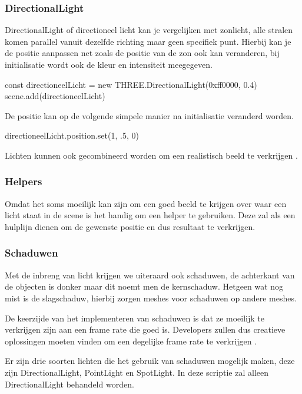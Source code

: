 \subsubsection{DirectionalLight}

DirectionalLight of directioneel licht kan je vergelijken met zonlicht, alle stralen komen parallel vanuit dezelfde richting maar geen specifiek punt. Hierbij kan je de positie aanpassen net zoals de positie van de zon ook kan veranderen, bij initialisatie wordt ook de kleur en intensiteit meegegeven.

\begin{LVerbatim}
const directioneelLicht = new THREE.DirectionalLight(0xff0000, 0.4)
scene.add(directioneelLicht)
\end{LVerbatim}

De positie kan op de volgende simpele manier na initialisatie veranderd worden.

\begin{LVerbatim}
directioneelLicht.position.set(1, .5, 0)
\end{LVerbatim}

Lichten kunnen ook gecombineerd worden om een realistisch beeld te verkrijgen  \autocite{Simon2023}.

\subsubsection{Helpers}

Omdat het soms moeilijk kan zijn om een goed beeld te krijgen over waar een licht staat in de scene is het handig om een helper te gebruiken. Deze zal als een hulplijn dienen om de gewenste positie en dus resultaat te verkrijgen.

\subsubsection{Schaduwen}

Met de inbreng van licht krijgen we uiteraard ook schaduwen, de achterkant van de objecten is donker maar dit noemt men de kernschaduw. Hetgeen wat nog mist is de slagschaduw, hierbij zorgen meshes voor schaduwen op andere meshes.

De keerzijde van het implementeren van schaduwen is dat ze moeilijk te verkrijgen zijn aan een frame rate die goed is. Developers zullen dus creatieve oplossingen moeten vinden om een degelijke frame rate te verkrijgen \autocite{Simon2023}.

Er zijn drie soorten lichten die het gebruik van schaduwen mogelijk maken, deze zijn DirectionalLight, PointLight en SpotLight. In deze scriptie zal alleen DirectionalLight behandeld worden.

